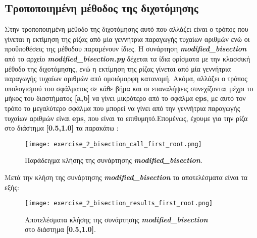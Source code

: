 \documentclass[First Project.tex]{subfiles}
\begin{document}
\subsection{ Τροποποιημένη μέθοδος της διχοτόμησης }

Στην τροποποιημένη μέθοδο της διχοτόμησης αυτό που αλλάζει είναι ο τρόπος που γίνεται η εκτίμηση της ρίζας από μία γεννήτρια παραγωγής 
τυχαίων αριθμών ενώ οι προϋποθέσεις της μέθοδου παραμένουν ίδιες. Η συνάρτηση \textit{\textlatin{\textbf{modified\_bisection}}} από το αρχείο 
\textit{\textlatin{\textbf{modified\_bisection.py}}} δέχεται τα ίδια ορίσματα με την κλασσική μέθοδο της διχοτόμησης, ενώ η εκτίμηση της ρίζας
γίνεται από μία γεννήτρια παραγωγής τυχαίων αριθμών από ομοιόμορφη κατανομή. Ακόμα, αλλάζει ο τρόπος υπολογισμού του σφάλματος σε κάθε βήμα
και οι επαναλήψεις συνεχίζονται μέχρι το μήκος του διαστήματος \textlatin{\textbf{[a,b]}} να γίνει μικρότερο από το σφάλμα \textlatin{\textbf{eps}}, με
αυτό τον τρόπο το μεγαλύτερο σφάλμα που μπορεί να γίνει από την γεννήτρια παραγωγής τυχαίων αριθμών είναι \textlatin{\textbf{eps}}, που είναι
το επιθυμητό.Επομένως, έχουμε για την ρίζα στο διάστημα \textbf{[0.5,1.0]} τα παρακάτω :
\vspace{5px}
\begin{figure}[h!]
    \centering
    \captionsetup{justification=centering}
    \begin{center}
        \texttt{[image: exercise\_2\_bisection\_call\_first\_root.png]}    
        \caption{Παράδειγμα κλήσης της συνάρτησης \textit{\textlatin{\textbf{modified\_bisection}}}.}
    \end{center}
\end{figure}


Μετά την κλήση της συνάρτησης \textit{\textlatin{\textbf{modified\_bisection}}} τα αποτελέσματα είναι τα εξής:
\vspace{5px}
\begin{figure}[h!]
    \centering
    \captionsetup{justification=centering}
    \begin{center}
    \texttt{[image: exercise\_2\_bisection\_results\_first\_root.png]}    
    \caption{ Αποτελέσματα κλήσης της συνάρτησης \textit{\textlatin{\textbf{modified\_bisection}}} \\ στο διάστημα \textbf{[0.5,1.0]}. }
    \end{center}
\end{figure}
\end{document}
